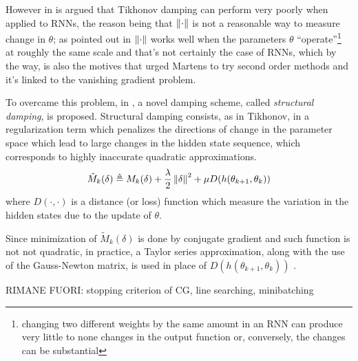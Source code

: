 However in \cite{hessianFree} is argued that Tikhonov damping can perform very poorly when applied to RNNs, the reason being that $\left\Vert \cdot \right\Vert$ is not a reasonable way to measure change in $\theta$; as pointed out in \cite{hessianFree} $\left\Vert \cdot \right\Vert$ works well when the parameters $\theta$ ``operate''\footnote{changing two different weights by the same amount in an RNN can produce very little to none changes in the output function or, conversely, the changes can be substantial} at roughly the same scale and that's not certainly the case of RNNs, which by the way, is also the motives that urged Martens to try second order methods and it's linked to the vanishing gradient problem. 

To overcame this problem, in \cite{hessianFree}, a novel damping scheme, called \textit{structural damping}, is proposed.
Structural damping consists, as in Tikhonov, in a regularization term which  penalizes the directions of change in the parameter space which lead to large changes in the hidden state sequence, which corresponds to highly inaccurate quadratic approximations.
\begin{equation}
 \tilde{M}_k(\delta) \triangleq  M_k(\delta) + \frac{\lambda}{2} \left\Vert \delta \right\Vert^2 + \mu D(h(\theta_{k+1}, \theta_{k}))
\end{equation}
where $D(\cdot,\cdot)$ is a distance (or loss) function which measure the variation in the hidden states due to the update of $\theta$.

Since minimization of $\tilde{M}_k(\delta)$ is done by conjugate gradient and such function is not not quadratic, in practice, a Taylor series approximation, along with the use of the Gauss-Newton matrix, is used in place of $D(h(\theta_{k+1}, \theta_{k}))$ .

RIMANE FUORI: stopping criterion of CG, line searching, minibatching


